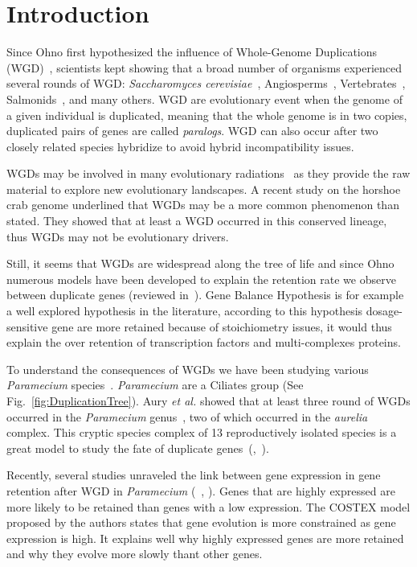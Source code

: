 \section*{Introduction}

Since Ohno first hypothesized the influence of Whole-Genome Duplications (WGD)~\citep{ohno_enormous_1970}, scientists kept showing that a broad number of organisms experienced several rounds of WGD: \textit{Saccharomyces cerevisiae}~\citep{fares_roles_2013}, Angiosperms~\citep{arrigo_rarely_2012}, Vertebrates~\citep{dehal_two_2005}, Salmonids~\citep{alexandrou_genome_2013}, and many others. WGD are evolutionary event when the genome of a given individual is duplicated, meaning that the whole genome is in two copies, duplicated pairs of genes are called \textit{paralogs}. WGD can also occur after two closely related species hybridize to avoid hybrid incompatibility issues.

WGDs may be involved in many evolutionary radiations~\citep{alexandrou_genome_2013} as they provide the raw material to explore new evolutionary landscapes. A recent study on the horshoe crab genome underlined that WGDs may be a more common phenomenon than stated. They showed that at least a WGD occurred in this conserved lineage, thus WGDs may not be evolutionary drivers.

Still, it seems that WGDs are widespread along the tree of life and since Ohno numerous models have been developed to explain the retention rate we observe between duplicate genes (reviewed in~\citet{innan_evolution_2010}). Gene Balance Hypothesis is for example a well explored hypothesis in the literature, according to this hypothesis dosage-sensitive gene are more retained because of stoichiometry issues, it would thus explain the over retention of transcription factors and multi-complexes proteins.

To understand the consequences of WGDs we have been studying various \textit{Paramecium} species~\citep{beisson_paramecium_2010}. \textit{Paramecium} are a Ciliates group (See Fig.~\ref{fig:DuplicationTree}). Aury \textit{et al.} showed that at least three round of WGDs occurred in the \textit{Paramecium} genus~\citep{aury_global_2006}, two of which occurred in the \textit{aurelia} complex. This cryptic species complex of 13 reproductively isolated species is a great model to study the fate of duplicate genes~(\citet{catania_genetic_2009},~\citet{mcgrath_insights_2014}).

Recently, several studies unraveled the link between gene expression in gene retention after WGD in \textit{Paramecium} (~\citet{gout_relationship_2010}, \citet{arnaiz_gene_2010}). Genes that are highly expressed are more likely to be retained than genes with a low expression. The COSTEX model proposed by the authors states that gene evolution is more constrained as gene expression is high. It explains well why highly expressed genes are more retained and why they evolve more slowly thant other genes.


